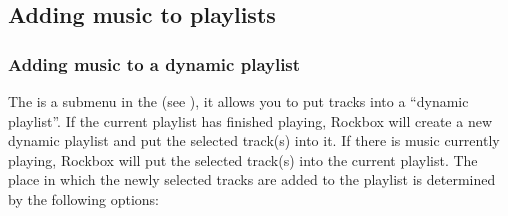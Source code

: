\subsection{Adding music to playlists}
  
\subsubsection{\label{ref:playlist_submenu}Adding music to a dynamic playlist}
The  is a submenu in the  (see
), it allows you to put tracks into a
``dynamic playlist''. If the current playlist has finished playing, Rockbox will
create a new dynamic playlist and put the selected track(s) into it.
If there is music currently playing, Rockbox will put the
selected track(s) into the current playlist. The place in which the newly
selected tracks are added to the playlist is determined by the following
options:

